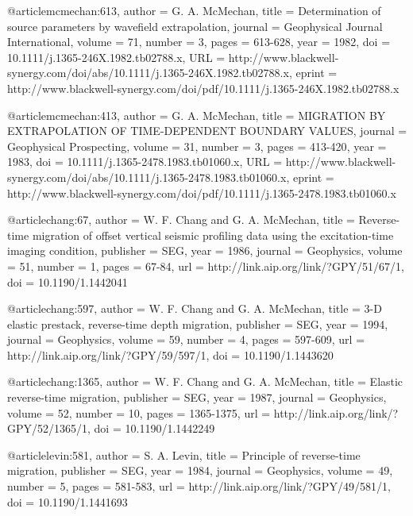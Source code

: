 @article{mcmechan:613,
  author =	 {G. A. McMechan},
  title =	 {Determination of source parameters by wavefield
                  extrapolation},
  journal =	 {Geophysical Journal International},
  volume =	 71,
  number =	 3,
  pages =	 {613-628},
  year =	 1982,
  doi =		 {10.1111/j.1365-246X.1982.tb02788.x},
  URL =
                  {http://www.blackwell-synergy.com/doi/abs/10.1111/j.1365-246X.1982.tb02788.x},
  eprint =
                  {http://www.blackwell-synergy.com/doi/pdf/10.1111/j.1365-246X.1982.tb02788.x}
}

@article{mcmechan:413,
  author =	 {G. A. McMechan},
  title =	 {MIGRATION BY EXTRAPOLATION OF TIME-DEPENDENT
                  BOUNDARY VALUES},
  journal =	 {Geophysical Prospecting},
  volume =	 31,
  number =	 3,
  pages =	 {413-420},
  year =	 1983,
  doi =		 {10.1111/j.1365-2478.1983.tb01060.x},
  URL =
                  {http://www.blackwell-synergy.com/doi/abs/10.1111/j.1365-2478.1983.tb01060.x},
  eprint =
                  {http://www.blackwell-synergy.com/doi/pdf/10.1111/j.1365-2478.1983.tb01060.x}
}

@article{chang:67,
  author =	 {W. F. Chang and G. A. McMechan},
  title =	 {Reverse-time migration of offset vertical seismic
                  profiling data using the excitation-time imaging
                  condition},
  publisher =	 {SEG},
  year =	 1986,
  journal =	 {Geophysics},
  volume =	 51,
  number =	 1,
  pages =	 {67-84},
  url =		 {http://link.aip.org/link/?GPY/51/67/1},
  doi =		 {10.1190/1.1442041}
}

@article{chang:597,
  author =	 {W. F. Chang and G. A. McMechan},
  title =	 {3-{D} elastic prestack, reverse-time depth
                  migration},
  publisher =	 {SEG},
  year =	 1994,
  journal =	 {Geophysics},
  volume =	 59,
  number =	 4,
  pages =	 {597-609},
  url =		 {http://link.aip.org/link/?GPY/59/597/1},
  doi =		 {10.1190/1.1443620}
}

@article{chang:1365,
  author =	 {W. F. Chang and G. A. McMechan},
  title =	 {Elastic reverse-time migration},
  publisher =	 {SEG},
  year =	 1987,
  journal =	 {Geophysics},
  volume =	 52,
  number =	 10,
  pages =	 {1365-1375},
  url =		 {http://link.aip.org/link/?GPY/52/1365/1},
  doi =		 {10.1190/1.1442249}
}

@article{levin:581,
  author =	 {S. A. Levin},
  title =	 {Principle of reverse-time migration},
  publisher =	 {SEG},
  year =	 1984,
  journal =	 {Geophysics},
  volume =	 49,
  number =	 5,
  pages =	 {581-583},
  url =		 {http://link.aip.org/link/?GPY/49/581/1},
  doi =		 {10.1190/1.1441693}
}

